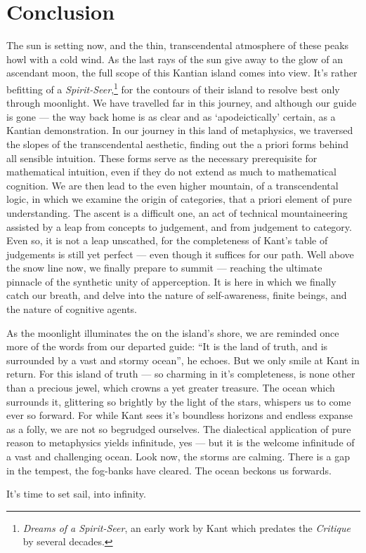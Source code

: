 \section{Conclusion}
The sun is setting now, and the thin, transcendental atmosphere of these peaks howl with a cold wind. As the last rays of the sun give away to the glow of an ascendant moon, the full scope of this Kantian island comes into view. It's rather befitting of a \emph{Spirit-Seer},\footnote{\emph{Dreams of a Spirit-Seer}, an early work by Kant which predates the \emph{Critique} by several decades.} for the contours of their island to resolve best only through moonlight. We have travelled far in this journey, and although our guide is gone --- the way back home is as clear and as \enquote*{apodeictically} certain, as a Kantian demonstration. In our journey in this land of metaphysics, we traversed the slopes of the transcendental aesthetic, finding out the a priori forms behind all sensible intuition. These forms serve as the necessary prerequisite for mathematical intuition, even if they do not extend as much to mathematical cognition. We are then lead to the even higher mountain, of a transcendental logic, in which we examine the origin of categories, that a priori element of pure understanding. The ascent is a difficult one, an act of technical mountaineering assisted by a leap from concepts to judgement, and from judgement to category. Even so, it is not a leap unscathed, for the completeness of Kant's table of judgements is still yet perfect --- even though it suffices for our path. Well above the snow line now, we finally prepare to summit --- reaching the ultimate pinnacle of the synthetic unity of apperception. It is here in which we finally catch our breath, and delve into the nature of self-awareness, finite beings, and the nature of cognitive agents.

As the moonlight illuminates the on the island's shore, we are reminded once more of the words from our departed guide: \enquote{It is the land of truth, and is surrounded by a vast and stormy ocean}, he echoes.  But we only smile at Kant in return. For this island of truth --- so charming in it's completeness, is none other than a precious jewel, which crowns a yet greater treasure. The ocean which surrounds it, glittering so brightly by the light of the stars, whispers us to come ever so forward. For while Kant sees it's boundless horizons and endless expanse as a folly, we are not so begrudged ourselves. The dialectical application of pure reason to metaphysics yields infinitude, yes --- but it is the welcome infinitude of a vast and challenging ocean. Look now, the storms are calming. There is a gap in the tempest, the fog-banks have cleared. The ocean beckons us forwards.

\noindent
It's time to set sail, into infinity.
